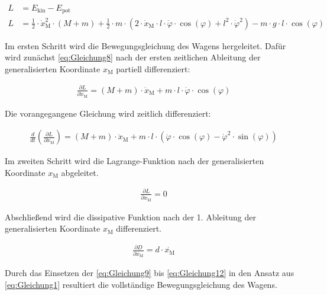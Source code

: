 \begin{align} 
        L &= E_{\mathrm{kin}} - E_{\mathrm{pot}}  \label{eq:Gleichung7} \\ 
        L &= \frac{1}{2} \cdot \dot{x}_{\mathrm{M}}^2 \cdot (M + m) + \frac{1}{2} \cdot m \cdot \left( 2 \cdot \dot{x}_{\mathrm{M}} \cdot l \cdot \dot{\varphi} \cdot \cos({\varphi}) + l^2 \cdot \dot{\varphi}^2\right) - m \cdot g \cdot l \cdot \cos({\varphi}) \label{eq:Gleichung8}
\end{align}

Im ersten Schritt wird die Bewegungsgleichung des Wagens hergeleitet. Dafür wird zunächst \autoref{eq:Gleichung8} nach der ersten zeitlichen Ableitung der generalisierten Koordinate $x_{\mathrm{M}}$ partiell differenziert:

\begin{align}\label{eq:Gleichung9}
    \frac{\partial L}{\partial \dot{x}_{\mathrm{M}}} = (M + m) \cdot \dot{x}_{\mathrm{M}} + m \cdot l \cdot \dot{\varphi} \cdot \cos(\varphi)
\end{align}

Die vorangegangene Gleichung wird zeitlich differenziert:

\begin{align}\label{eq:Gleichung10}
    \frac{d}{dt}\left(\frac{\partial L}{\partial \dot{x}_{\mathrm{M}}}\right) = (M + m) \cdot \ddot{x}_{\mathrm{M}} + m \cdot l \cdot \left(\ddot{\varphi} \cdot \cos(\varphi) - \dot{\varphi}^2 \cdot \sin(\varphi) \right)
\end{align}

Im zweiten Schritt wird die Lagrange-Funktion nach der generalisierten Koordinate $x_{\mathrm{M}}$ abgeleitet.

\begin{align}\label{eq:Gleichung11}
    \frac{\partial L}{\partial x_{\mathrm{M}}} = 0
\end{align}

Abschließend wird die dissipative Funktion nach der 1. Ableitung der generalisierten Koordinate $x_{\mathrm{M}}$ differenziert.

\begin{align}\label{eq:Gleichung12}
    \frac{\partial D}{\partial \dot{x_{\mathrm{M}}}} = d \cdot \dot{x_{\mathrm{M}}}
\end{align}

Durch das Einsetzen der \autoref{eq:Gleichung9} bis \autoref{eq:Gleichung12} in den Ansatz aus \autoref{eq:Gleichung1} resultiert die vollständige Bewegungsgleichung des Wagens.


